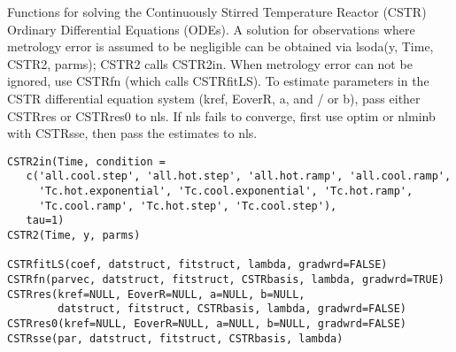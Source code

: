 \documentclass{article}
\begin{document}
\begin{Description}\relax
Functions for solving the Continuously Stirred Temperature Reactor
(CSTR) Ordinary Differential Equations (ODEs).  A solution for
observations where metrology error is assumed to be negligible can be 
obtained via lsoda(y, Time, CSTR2, parms);  CSTR2 calls CSTR2in.  When
metrology error can not be ignored, use CSTRfn (which calls
CSTRfitLS).  To estimate parameters in the CSTR differential equation
system (kref, EoverR, a, and / or b), pass either CSTRres or CSTRres0
to nls.  If nls fails to converge, first use optim or nlminb with
CSTRsse, then pass the estimates to nls.
\end{Description}
\begin{Usage}
\begin{verbatim}
CSTR2in(Time, condition =
   c('all.cool.step', 'all.hot.step', 'all.hot.ramp', 'all.cool.ramp',
     'Tc.hot.exponential', 'Tc.cool.exponential', 'Tc.hot.ramp',
     'Tc.cool.ramp', 'Tc.hot.step', 'Tc.cool.step'),
   tau=1)
CSTR2(Time, y, parms)  

CSTRfitLS(coef, datstruct, fitstruct, lambda, gradwrd=FALSE)
CSTRfn(parvec, datstruct, fitstruct, CSTRbasis, lambda, gradwrd=TRUE)
CSTRres(kref=NULL, EoverR=NULL, a=NULL, b=NULL,
        datstruct, fitstruct, CSTRbasis, lambda, gradwrd=FALSE)
CSTRres0(kref=NULL, EoverR=NULL, a=NULL, b=NULL, gradwrd=FALSE)
CSTRsse(par, datstruct, fitstruct, CSTRbasis, lambda)

\end{verbatim}
\end{Usage}
\end{document}
